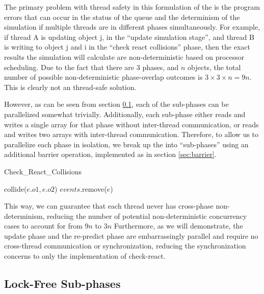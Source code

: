 \documentclass[conference]{IEEEtran}
\begin{document}
The primary problem with thread safety in this formulation of the  is the program errors that can occur in the status of the queue and the determinism of the simulation
if multiple threads are in different phases simultaneously.  For example, if thread A is updating object j, in the ``update simulation stage'', and thread B is writing to object 
j and i in the ``check react collisions'' phase, then the exact results the simulation will calculate are non-deterministic based on processor scheduling.  
Due to the fact that there are 3 phases, and $n$ objects, the total number of possible non-deterministic phase-overlap outcomes is $3\times3\times n=9n$.  This is clearly not an thread-safe solution.

However, as can be seen from section \ref{sec:subphase}, each of the sub-phases can be parallelized somewhat trivially.  Additionally, each sub-phase either reads and writes
a single array for that phase without inter-thread communication, or reads and writes two arrays with inter-thread communication.  Therefore, to allow us to parallelize each
phase in isolation, we break up the  into ``sub-phases'' using an additional barrier operation, implemented as in section \ref{sec:barrier}.  

\begin{algorithm}
\caption{Check\_React\_Collisions}
\begin{algorithmic}
\STATE {}
	\STATE {}
		\STATE {}
		\STATE collide($e.o1,e.o2$)
	\ENDIF
	\STATE {}
	\STATE $events$.remove($e$)
\ENDFOR
\end{algorithmic}
\end{algorithm}

This way, we can guarantee that each thread never has cross-phase non-determinism, reducing the number of potential non-deterministic concurrency cases to account for from $9n$ to $3n$
Furthermore, as we will demonstrate, the update phase and the re-predict phase are embarrassingly parallel and require no cross-thread communication or synchronization,
reducing the synchronization concerns to only the implementation of check-react.

\subsection{Lock-Free Sub-phases}
\label{sec:subphase}
\end{document}
